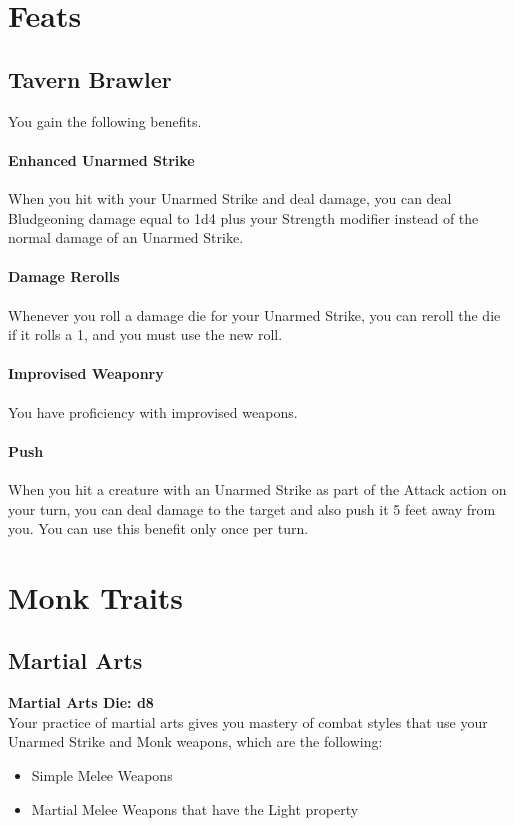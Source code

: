 \documentclass[letterpaper,openany,oneside,twocolumn]{book}
\begin{document}
\section*{Feats}
\subsection*{Tavern Brawler}
You gain the following benefits.

\paragraph*{Enhanced Unarmed Strike} When you hit with your Unarmed Strike and deal damage, you can deal Bludgeoning damage equal to 1d4 plus your Strength modifier instead of the normal damage of an Unarmed Strike.

\paragraph*{Damage Rerolls} Whenever you roll a damage die for your Unarmed Strike, you can reroll the die if it rolls a 1, and you must use the new roll.

\paragraph*{Improvised Weaponry} You have proficiency with improvised weapons.

\paragraph*{Push} When you hit a creature with an Unarmed Strike as part of the Attack action on your turn, you can deal damage to the target and also push it 5 feet away from you. You can use this benefit only once per turn.

\section*{Monk Traits}
\subsection*{Martial Arts}
\textbf{Martial Arts Die: d8}\\
Your practice of martial arts gives you mastery of combat styles that use your Unarmed Strike and Monk weapons, which are the following:
\begin{itemize}
	\item Simple Melee Weapons
	\item Martial Melee Weapons that have the Light property
\end{itemize}
\end{document}
